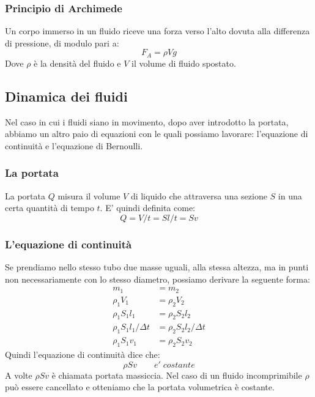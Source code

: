 \documentclass{article}
\begin{document}
\subsubsection{Principio di Archimede}
Un corpo immerso in un fluido riceve una forza verso l'alto dovuta alla differenza di pressione, di modulo pari a:
\begin{equation}
    F_A=\rho V g
\end{equation}
Dove $\rho$ è la densità del fluido e $V$ il volume di fluido spostato.

\subsection{Dinamica dei fluidi}
Nel caso in cui i fluidi siano in movimento, dopo aver introdotto la portata, abbiamo un altro paio di equazioni con le quali possiamo lavorare: l'equazione di continuità e l'equazione di Bernoulli.

\subsubsection{La portata}
La portata $Q$ misura il volume $V$ di liquido che attraversa una sezione $S$ in una certa quantità di tempo $t$. E' quindi definita come:
\begin{equation}
    Q=V/t=S l/t=Sv
\end{equation}

\subsubsection{L'equazione di continuità}
Se prendiamo nello stesso tubo due masse uguali, alla stessa altezza, ma in punti non necessariamente con lo stesso diametro, possiamo derivare la seguente forma:
\begin{align*}
    m_1&=m_2 \\
    \rho_1 V_1&=\rho_2 V_2 \\
    \rho_1 S_1 l_1&=\rho_2 S_2 l_2 \\
    \rho_1 S_1 l_1 /\Delta t&=\rho_2 S_2 l_2/\Delta t  \\
    \rho_1 S_1 v_1 &=\rho_2 S_2 v_2
\end{align*}
Quindi l'equazione di continuità dice che:
\begin{equation}
    \rho S v \qquad e' \; costante
\end{equation}
A volte $\rho S v$ è chiamata portata massiccia. Nel caso di un fluido incomprimibile $\rho$ può essere cancellato e otteniamo che la portata volumetrica è costante.
\end{document}
